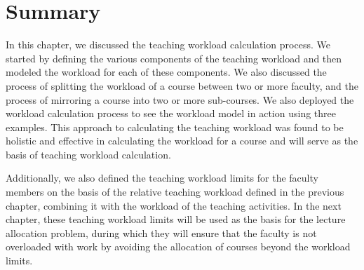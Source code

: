 \section{Summary}

In this chapter, we discussed the teaching workload calculation process. We started by defining the various components of the teaching workload and then modeled the workload for each of these components. We also discussed the process of splitting the workload of a course between two or more faculty, and the process of mirroring a course into two or more sub-courses. We also deployed the workload calculation process to see the workload model in action using three examples. This approach to calculating the teaching workload was found to be holistic and effective in calculating the workload for a course and will serve as the basis of teaching workload calculation.

Additionally, we also defined the teaching workload limits for the faculty members on the basis of the relative teaching workload defined in the previous chapter, combining it with the workload of the teaching activities. In the next chapter, these teaching workload limits will be used as the basis for the lecture allocation problem, during which they will ensure that the faculty is not overloaded with work by avoiding the allocation of courses beyond the workload limits.
